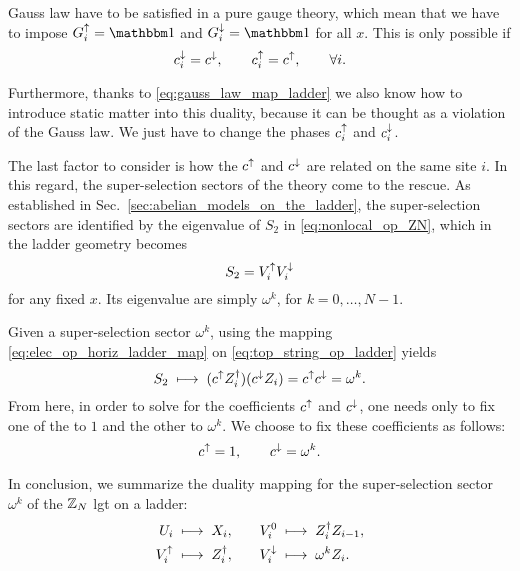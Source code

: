 Gauss law have to be satisfied in a pure gauge theory, which mean that we have to impose $G^\uparrow_i = \identity$ and $G^\downarrow_i = \identity$ for all $x$.
This is only possible if
\begin{equation}
    c^{\downarrow}_i = c^{\downarrow}, \qquad
    c^{\uparrow}_i = c^{\uparrow}, \qquad
    \forall i.
\end{equation}

Furthermore, thanks to \eqref{eq:gauss_law_map_ladder}  we also know how to introduce static matter into this duality, because it can be thought as a violation of the Gauss law.
We just have to change the phases $c^{\uparrow}_i$ and $c^{\downarrow}_i$.

The last factor to consider is how the $c^{\uparrow}$ and $c^{\downarrow}$ are related on the same site $i$.
In this regard, the super-selection sectors of the theory come to the rescue.
As established in Sec.~\ref{sec:abelian_models_on_the_ladder}, the super-selection sectors are identified by the eigenvalue of $S_2$ in \eqref{eq:nonlocal_op_ZN}, which in the ladder geometry becomes
\begin{equation}
    S_2 = V^{\uparrow}_i V^{\downarrow}_i
    \label{eq:top_string_op_ladder}
\end{equation}
for any fixed $x$.
Its eigenvalue are simply $\omega^k$, for $k = 0, \dots, N-1$.

Given a super-selection sector $\omega^k$, using the mapping \eqref{eq:elec_op_horiz_ladder_map} on \eqref{eq:top_string_op_ladder} yields
\begin{equation}
    S_2 \; \longmapsto \; ( c^{\uparrow} Z^\dagger_i ) ( c^{\downarrow} Z_i ) = c^{\uparrow} c^{\downarrow} = \omega^k.
\end{equation}
From here, in order to solve for the coefficients $c^{\uparrow}$ and $c^{\downarrow}$, one needs only to fix one of the to $1$ and the other to $\omega^k$.
We choose to fix these coefficients as follows:
\begin{equation}
    c^{\uparrow} = 1, \qquad
    c^{\downarrow} = \omega^k.
\end{equation}

In conclusion, we summarize the duality mapping for the super-selection sector $\omega^k$ of the $\mathbb{Z}_N$ \ac{lgt} on a ladder:
\begin{equation}
    \begin{aligned}
       U_i      & \; \longmapsto \; X_i, \quad &
        V^0_i    & \; \longmapsto \; Z^\dagger_i Z_{i-1}, \\
        V^{\uparrow}_i   & \; \longmapsto \; Z_i^\dagger, \quad &
        V^{\downarrow}_i & \; \longmapsto \; \omega^k Z_i.
    \end{aligned}
    \label{eq:ladder_duality}
\end{equation}

